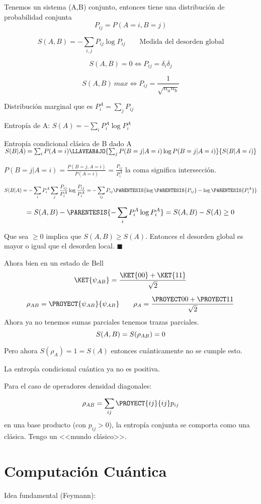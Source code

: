 Tenemos un sistema (A,B) conjunto, entonces tiene una distribución
de probabilidad conjunta
\[
P_{ij}=P(A=i,B=j)
\]
 
\[
S(A,B)=-\sum_{i,j}P_{ij}\log P_{ij}\qquad\text{Medida del desorden global}
\]

\[
S(A,B)=0\iff P_{ij}=\delta_{i}\delta_{j}
\]

\[
S(A,B)\:max\iff P_{ij}=\frac{1}{\sqrt{n_{a}n_{b}}}
\]

Distribución marginal que es $P_{i}^{A}=\sum_{j}P_{ij}$

Entropía de A: $S(A)=-\sum_{i}P_{i}^{A}\log P_{i}^{A}$

Entropía condicional clásica de B dado A $S(B|A)=\sum_{i}P(A=i)\LLAVEABAJO{\sum_{j}P(B=j|A=i)\log P(B=j|A=i)}{S(B|A=i)}$

$P(B=j|A=i)=\frac{P(B=j,A=i)}{P(A=i)}=\frac{P_{ij}}{P_{i}^{A}}$ la
coma significa intersección. 

\[
S(B|A)=-\sum_{i}P_{i}^{A}\sum_{j}\frac{P_{ij}}{P_{i}^{A}}\log\frac{P_{ij}}{P_{i}^{A}}=-\sum_{ij}P_{ij}\PARENTESIS{\log\PARENTESIS{P_{ij}}-\log\PARENTESIS{P_{i}^{A}}}
\]

\[
=S(A,B)-\PARENTESIS{-\sum_{i}P_{i}^{A}\log P_{i}^{A}}=S(A,B)-S(A)\geq0
\]

Que sea $\geq0$ implica que $S(A,B)\geq S(A)$. Entonces el desorden
global es mayor o igual que el desorden local. $\blacksquare$

Ahora bien en un estado de Bell 
\[
\KET{\psi_{AB}}=\frac{\KET{00}+\KET{11}}{\sqrt{2}}
\]
 
\[
\rho_{AB}=\PROYECT{\psi_{AB}}{\psi_{AB}}\qquad\rho_{A}=\frac{\PROYECT 00+\PROYECT 11}{\sqrt{2}}
\]
Ahora ya no tenemos sumas parciales tenemos trazas parciales.
\[
S(A,B)=S(\text{\ensuremath{\rho_{AB}}})=0
\]

Pero ahora $S(\rho_{A})=1=S(A)$ entonces cuánticamente no se cumple
esto.

La entropía condicional cuántica ya no es positiva. 

Para el caso de operadores densidad diagonales:

\[
\rho_{AB}=\sum_{ij}\PROYECT{ij}{ij}p_{ij}
\]
en una base producto (con $p_{ij}>0$), la entropía conjunta se comporta
como una clásica. Tengo un <<mundo clásico>>.

\section{Computación Cuántica}

Idea fundamental (Feymann):

